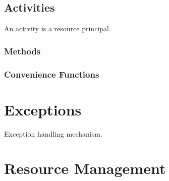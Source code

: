 \cleardoublepage
\section{Activities}

An activity is a resource principal.

\subsection{Methods}

\subsection{Convenience Functions}

\chapter{Exceptions}

Exception handling mechanism.

\chapter{Resource Management}
